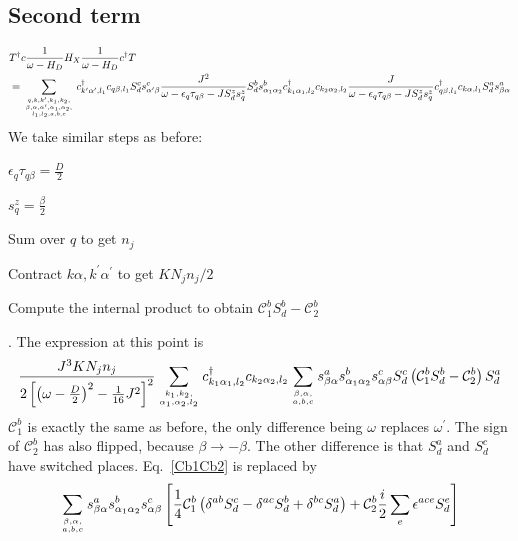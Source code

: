 \documentclass{revtex4-2}
\numberwithin{equation}{section}
\begin{document}
\subsection{Second term}
\begin{equation}\begin{aligned}
	&T^\dagger c \frac{1}{\omega - H_D} H_X \frac{1}{\omega - H_D} c^\dagger T\\
	&= \sum_{q, k, k^\prime, k_1,k_2,\atop{\beta, \alpha, \alpha^\prime, \alpha_1,\alpha_2,\atop{l_1,l_2,a,b,c}}}c^\dagger_{k^\prime\alpha^\prime, l_1} c_{q\beta, l_1}  S_d^c s^c_{\alpha^\prime \beta} \frac{J^2}{\omega - \epsilon_q\tau_{q\beta} - J S_d^z s_q^z} S_d^b s^b_{\alpha_1 \alpha_2} c^\dagger_{k_1\alpha_1,l_2}c_{k_2 \alpha_2,l_2} \frac{J}{\omega - \epsilon_q\tau_{q\beta} - J S_d^z s_q^z} c^\dagger_{q\beta,l_1} c_{k\alpha,l_1} S_d^a s^a_{\beta \alpha}
\end{aligned}\end{equation}
We take similar steps as before:
\begin{inparaenum}
	\item \(\epsilon_q \tau_{q\beta} = \frac{D}{2}\)
	\item \(s^z_q = \frac{\beta}{2}\)
	\item Sum over \(q\) to get \(n_j\)
	\item Contract \(k\alpha,k^\prime\alpha^\prime\) to get \(K N_j n_j / 2\)
	\item Compute the internal product to obtain \(\mathcal{C}_1^b S_d^b - \mathcal{C}_2^b\)
\end{inparaenum}.
The expression at this point is
\begin{equation}\begin{aligned}
	\label{Cb1Cb2_2}
	\frac{J^3 K N_j n_j }{2\left[\left(\omega - \frac{D}{2}\right)^2 - \frac{1}{16}J^2\right]^2}\sum_{k_1,k_2,\atop{\alpha_1,\alpha_2,l_2}}c^\dagger_{k_1\alpha_1,l_2}c_{k_2 \alpha_2,l_2} \sum_{\beta,\alpha, \atop{a,b,c}}s^a_{\beta \alpha} s^b_{\alpha_1 \alpha_2}s^c_{\alpha \beta} S_d^c \left(\mathcal{C}_1^b S_d^b - \mathcal{C}_2^b\right) S_d^a
\end{aligned}\end{equation}
\(\mathcal{C}^b_1\) is exactly the same as before, the only difference being \(\omega\) replaces \(\omega^\prime\). The sign of \(\mathcal{C}^b_2\) has also flipped, because \(\beta \to -\beta\). The other difference is that \(S_d^a\) and \(S_d^c\) have switched places. Eq.~\ref{Cb1Cb2} is replaced by
\begin{equation}\begin{aligned}
	\label{Cb1Cb2_3}
	\sum_{\beta,\alpha, \atop{a,b,c}}s^a_{\beta \alpha} s^b_{\alpha_1 \alpha_2}s^c_{\alpha \beta}\left[\frac{1}{4}\mathcal{C}_1^b \left(\delta^{ab}S_d^c - \delta^{ac}S_d^b + \delta^{bc}S_d^a\right) + \mathcal{C}_2^b \frac{i}{2}\sum_{e}\epsilon^{ace}S_d^e\right]
\end{aligned}\end{equation}
\end{document}
